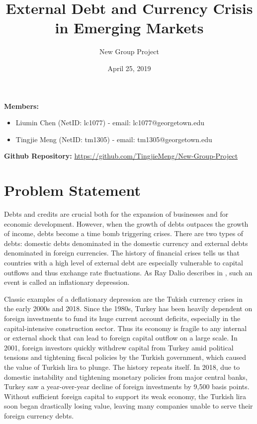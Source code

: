 \documentclass[12pt,]{article}
\title{External Debt and Currency Crisis in Emerging Markets}
\author{New Group Project}
\date{April 25, 2019}
\begin{document}
\maketitle

\textbf{Members:}

\begin{itemize}
  \itemsep-.6em
  \item Liumin Chen (NetID: lc1077) - email: lc1077@georgetown.edu\
  \item Tingjie  Meng (NetID: tm1305) - email: tm1305@georgetown.edu\
\end{itemize}

\textbf{Github Repository:}
\url{https://github.com/TingjieMeng/New-Group-Project}

\section{Problem Statement}

Debts and credits are crucial both for the expansion of businesses and
for economic development. However, when the growth of debts outpaces the
growth of income, debts become a time bomb triggering crises. There are
two types of debts: domestic debts denominated in the domestic currency
and external debts denominated in foreign currencies. The history of
financial crises tells us that countries with a high level of external
debt are especially vulnerable to capital outflows and thus exchange
rate fluctuations. As Ray Dalio describes in , such an event is called
an inflationary depression.

Classic examples of a deflationary depression are the Tukish currency
crises in the early 2000s and 2018. Since the 1980s, Turkey has been
heavily dependent on foreign investments to fund its huge current
account deficits, especially in the capital-intensive construction
sector. Thus its economy is fragile to any internal or external shock
that can lead to foreign capital outflow on a large scale. In 2001,
foreign investors quickly withdrew capital from Turkey amid political
tensions and tightening fiscal policies by the Turkish government, which
caused the value of Turkish lira to plunge. The history repeats itself.
In 2018, due to domestic instability and tightening monetary policies
from major central banks, Turkey saw a year-over-year decline of foreign
investments by 9,500 basis points. Without sufficient foreign capital to
support its weak economy, the Turkish lira soon began drastically losing
value, leaving many companies unable to serve their foreign currency
debts.
\end{document}
